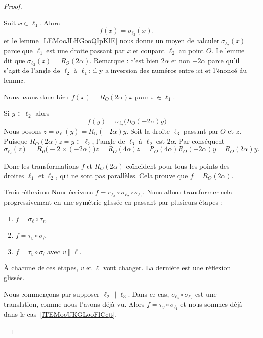 \begin{proof}
\begin{subproof}
		Soit \( x\in \ell_1\). Alors
		\begin{equation}
			f(x)=\sigma_{\ell_2}(x),
		\end{equation}
		et le lemme~\ref{LEMooJLHGooQIpKIE} nous donne un moyen de calculer \( \sigma_{\ell_2}(x)\) parce que \( \ell_1\) est une droite passant par \( x\) et coupant \( \ell_2\) au point \( O\). Le lemme dit que \( \sigma_{\ell_2}(x)=R_O(2\alpha)\). Remarque : c'est bien \( 2\alpha\) et non \( -2\alpha\) parce qu'il s'agit de l'angle de \( \ell_2\) à \( \ell_1\); il y a inversion des numéros entre ici et l'énoncé du lemme.

		Nous avons donc bien \( f(x)=R_O(2\alpha)x\) pour \( x\in \ell_1\).

		Si \( y\in\ell_2\) alors
		\begin{equation}
			f(y)=\sigma_{\ell_2}\big( R_O(-2\alpha)y \big)
		\end{equation}
		Nous posons \( z=\sigma_{\ell_1}(y)=R_O(-2\alpha)y\). Soit la droite \( \ell_3\) passant par \( O\) et \( z\). Puisque \( R_O(2\alpha)z=y\in \ell_2\), l'angle de \( \ell_3\) à \( \ell_2\) est \( 2\alpha\). Par conséquent
		\begin{equation}
			\sigma_{\ell_2}(z)=R_O\big( -2\times (-2\alpha) \big)z=R_O(4\alpha)z=R_O(4\alpha)R_O(-2\alpha)y=R_O(2\alpha)y.
		\end{equation}

		Donc les transformations \( f\) et \( R_O(2\alpha)\) coïncident pour tous les points des droites \( \ell_1\) et \( \ell_2\), qui ne sont pas parallèles. Cela prouve que \( f=R_{O}(2\alpha)\).

		\item[Trois réflexions]
		Nous écrivons \( f=\sigma_{\ell_3}\circ\sigma_{\ell_2}\circ\sigma_{\ell_1}\). Nous allons transformer cela progressivement en une symétrie glissée en passant par plusieurs étapes :
		\begin{enumerate}
			\item       \label{ITEMooHVYCooPhFMiv}
			      \( f=\sigma_{\ell}\circ\tau_v\),
			\item       \label{ITEMooUKGLooFlCcjt}
			      \( f=\tau_v\circ\sigma_{\ell}\),
			\item       \label{ITEMooWUCWooZSjofe}
			      \( f=\tau_v\circ\sigma_{\ell} \) avec \( v\parallel\ell\).
		\end{enumerate}
		À chacune de ces étapes, \( v\) et \( \ell\) vont changer. La dernière est une réflexion glissée.

		Nous commençons par supposer \( \ell_2\parallel\ell_3\). Dans ce cas, \( \sigma_{\ell_3}\circ\sigma_{\ell_2}\) est une translation, comme nous l'avons déjà vu. Alors \( f= \tau_v\circ\sigma_{\ell_1}\) et nous sommes déjà dans le cas~\ref{ITEMooUKGLooFlCcjt}.


\end{subproof}
\end{proof}
